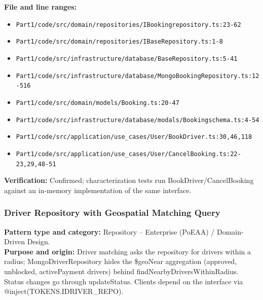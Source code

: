\documentclass[11pt,a4paper]{article}
\begin{document}
\noindent\textbf{File and line ranges:}\begin{itemize}\setlength\itemsep{0pt}\item \texttt{Part1/\allowbreak{}code/\allowbreak{}src/\allowbreak{}domain/\allowbreak{}repositories/\allowbreak{}IBookingrepository.\allowbreak{}ts:23-62}\item \texttt{Part1/\allowbreak{}code/\allowbreak{}src/\allowbreak{}domain/\allowbreak{}repositories/\allowbreak{}IBaseRepository.\allowbreak{}ts:1-8}\item \texttt{Part1/\allowbreak{}code/\allowbreak{}src/\allowbreak{}infrastructure/\allowbreak{}database/\allowbreak{}BaseRepository.\allowbreak{}ts:5-41}\item \texttt{Part1/\allowbreak{}code/\allowbreak{}src/\allowbreak{}infrastructure/\allowbreak{}database/\allowbreak{}MongoBookingRepository.\allowbreak{}ts:12-516}\item \texttt{Part1/\allowbreak{}code/\allowbreak{}src/\allowbreak{}domain/\allowbreak{}models/\allowbreak{}Booking.\allowbreak{}ts:20-47}\item \texttt{Part1/\allowbreak{}code/\allowbreak{}src/\allowbreak{}infrastructure/\allowbreak{}database/\allowbreak{}modals/\allowbreak{}Bookingschema.\allowbreak{}ts:4-54}\item \texttt{Part1/\allowbreak{}code/\allowbreak{}src/\allowbreak{}application/\allowbreak{}use\_\allowbreak{}cases/\allowbreak{}User/\allowbreak{}BookDriver.\allowbreak{}ts:30,46,118}\item \texttt{Part1/\allowbreak{}code/\allowbreak{}src/\allowbreak{}application/\allowbreak{}use\_\allowbreak{}cases/\allowbreak{}User/\allowbreak{}CancelBooking.\allowbreak{}ts:22-23,29,48-51}\end{itemize}
\noindent\textbf{Verification:} Confirmed; characterization tests run BookDriver/CancelBooking against an in-memory implementation of the same interface.

\subsubsection*{Driver Repository with Geospatial Matching Query}
\textbf{Pattern type and category:} Repository -- Enterprise (PoEAA) / Domain-Driven Design.\\
\textbf{Purpose and origin:} Driver matching asks the repository for drivers within a radius; MongoDriverRepository hides the \$geoNear aggregation (approved, unblocked, activePayment drivers) behind findNearbyDriversWithinRadius. Status changes go through updateStatus. Clients depend on the interface via @inject(TOKENS.IDRIVER\_REPO).
\end{document}
